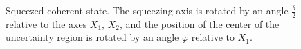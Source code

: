 \begin{figure}
\centering



\caption{Squeezed coherent state. The squeezing axis is rotated by an angle $\frac{\theta}{2}$
relative to the axes $X_1$, $X_2$, and the position of the center of the uncertainty region is rotated by an angle $\varphi$ relative to
$X_1$.}
\label{figPart3Squeezed_9}
\end{figure}
